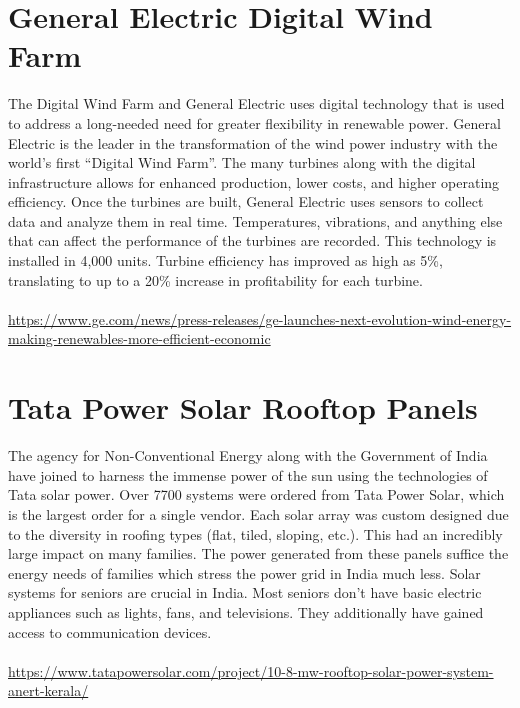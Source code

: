 \documentclass{article}
\begin{document}
    
    \begin{spacing}{2.15}
    \tableofcontents
    \newpage
    \section{General Electric Digital Wind Farm}
    \indent The Digital Wind Farm and General Electric uses digital technology that is used to address a long-needed need for greater flexibility in renewable power. General Electric is the leader in the transformation of the wind power industry with the world's first ``Digital Wind Farm''. The many turbines along with the digital infrastructure allows for enhanced production, lower costs, and higher operating efficiency. Once the turbines are built, General Electric uses sensors to collect data and analyze them in real time. Temperatures, vibrations, and anything else that can affect the performance of the turbines are recorded. This technology is installed in 4,000 units. Turbine efficiency has improved as high as 5\%, translating to up to a 20\% increase in profitability for each turbine.\\\\
    \url{https://www.ge.com/news/press-releases/ge-launches-next-evolution-wind-energy-making-renewables-more-efficient-economic}
    \section{Tata Power Solar Rooftop Panels}
    \indent The agency for Non-Conventional Energy along with the Government of India have joined to harness the immense power of the sun using the technologies of Tata solar power. Over 7700 systems were ordered from Tata Power Solar, which is the largest order for a single vendor. Each solar array was custom designed due to the diversity in roofing types (flat, tiled, sloping, etc.). This had an incredibly large impact on many families. The power generated from these panels suffice the energy needs of families which stress the power grid in India much less. Solar systems for seniors are crucial in India. Most seniors don't have basic electric appliances such as lights, fans, and televisions. They additionally have gained access to communication devices.\\\\
    \url{https://www.tatapowersolar.com/project/10-8-mw-rooftop-solar-power-system-anert-kerala/}
    \newpage

\end{spacing}
\end{document}

